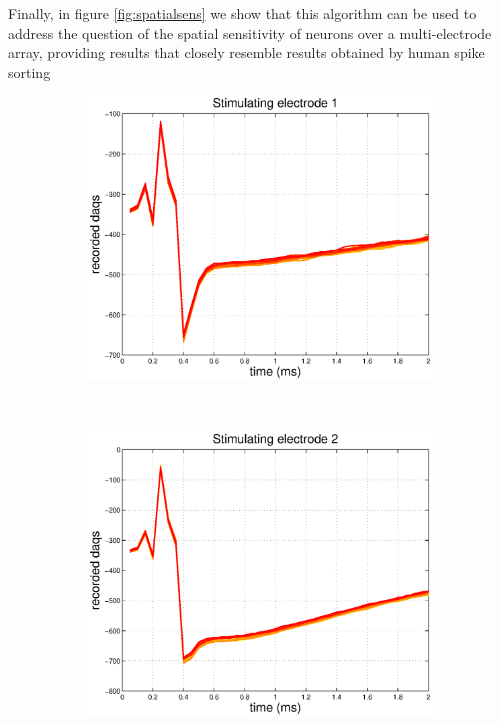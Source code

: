 \documentclass[12pt,letterpaper,fleqn]{article}
\begin{document}
Finally, in figure \ref{fig:spatialsens} we show that this algorithm can be used to address the question of the spatial sensitivity of neurons over a multi-electrode array, providing results that closely resemble results obtained by human spike sorting 
 \begin{figure}[ht!]
        \centering
        \begin{subfigure}[b]{0.32\textwidth}
                \includegraphics[width=\textwidth]{ArtTraceS1.eps}
                \caption{}
        \end{subfigure}%
~\begin{subfigure}[b]{0.32\textwidth}
                \includegraphics[width=\textwidth]{ArtTraceS2.eps}

\end{subfigure}
\end{figure}
\end{document}
